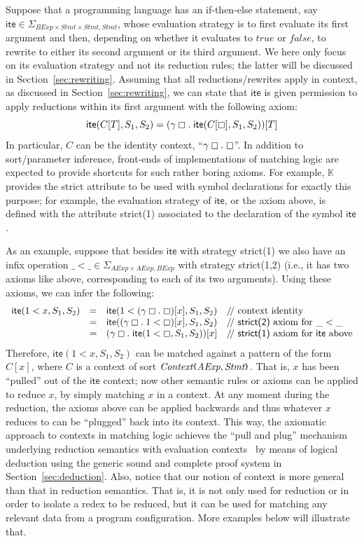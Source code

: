 \documentclass[UTF8,11pt]{article}
\theoremstyle{plain}
\theoremstyle{definition}
\theoremstyle{remark}
\newcommand{\K}{\mbox{$\mathbb{K}$}\xspace}
\newcommand{\Context}{\textit{Context}}
\newcommand{\hole}{\boxempty}
\newcommand{\AExp}{\textit{AExp}}
\newcommand{\BExp}{\textit{BExp}}
\newcommand{\Stmt}{\textit{Stmt}}
\newcommand{\ite}{\textsf{ite}}
\newcommand{\ttrue}{\textit{true}}
\newcommand{\ffalse}{\textit{false}}
\newcommand{\parametric}[2]{{#1}\raisebox{.2ex}{\texttt{\footnotesize{\{}}}#2\raisebox{.2ex}{\texttt{\footnotesize{\}}}}}
\newcommand{\doubleslash}{/\!/{ }}
\begin{document}
Suppose that a programming language has an if-then-else statement,
say $\ite\in\Sigma_{\BExp\times\Stmt\times\Stmt,\Stmt}$,
whose evaluation strategy is to first evaluate its first argument and then, depending
on whether it evaluates to $\ttrue$ or $\ffalse$, to rewrite to either
its second argument or its third argument.
We here only focus on its evaluation strategy and not its reduction rules;
the latter will be discussed in Section~\ref{sec:rewriting}.
Assuming that all reductions/rewrites apply in context, as discussed in
Section~\ref{sec:rewriting}, we can state that $\ite$ is given permission to
apply reductions within its first argument with the following axiom:
$$
\ite(C[T],S_1,S_2) = (\gamma\hole.\;\ite(C[\hole],S_1,S_2))[T]
$$
In particular, $C$ can be the identity context, ``$\gamma \hole .\; \hole$''.
In addition to sort/parameter inference, front-ends of implementations of
matching logic are expected to provide shortcuts for such rather boring
axioms.
For example, \K provides the \textsf{strict} attribute to be used with symbol
declarations for exactly this purpose; for example, the evaluation strategy
of $\ite$, or the axiom above, is defined with the attribute
\textsf{strict(1)} associated to the declaration of the symbol $\ite$.

As an example, suppose that besides $\ite$ with strategy \textsf{strict(1)}
we also have an infix operation $\_<\_\in\Sigma_{\AExp\times\AExp,\BExp}$ with
strategy \textsf{strict(1,2)}
(i.e., it has two axioms like above, corresponding to each of its two
arguments).
Using these axioms, we can infer the following:
$$
\begin{array}{rcll}
\ite(1 < x,S_1,S_2) & = &
\ite(1 < (\gamma\hole.\;\hole)[x],S_1,S_2)
& \textrm{\doubleslash context identity}
\\
& = &
\ite((\gamma\hole.\;1 < \hole)[x],S_1,S_2)
& \textrm{\doubleslash \textsf{strict(2)} axiom for $\_<\_$}
\\
& = &
(\gamma\hole.\;\ite(1 < \hole,S_1,S_2))[x]
& \textrm{\doubleslash \textsf{strict(1)} axiom for $\ite$ above}
\end{array}
$$
Therefore, $\ite(1 < x,S_1,S_2)$ can be matched against a pattern
of the form $C[x]$, where $C$ is a context of sort
$\parametric{\Context}{\AExp,\Stmt}$.
That is, $x$ has been ``pulled'' out of the $\ite$ context;
now other semantic rules or axioms can be applied to reduce $x$, by
simply matching $x$ in a context.
At any moment during the reduction, the axioms above can be applied
backwards and thus whatever $x$ reduces to can be ``plugged'' back into
its context.
This way, the axiomatic approach to contexts in matching logic
achieves the ``pull and plug'' mechanism underlying reduction
semantics with evaluation contexts~\cite{felleisen-hieb-92} by
means of logical deduction using the generic sound and complete
proof system in Section~\ref{sec:deduction}.
Also, notice that our notion of context is more general than
that in reduction semantics.
That is, it is not only used for reduction or in order to isolate
a redex to be reduced, but it can be used for matching any relevant
data from a program configuration.
More examples below will illustrate that.
\end{document}
